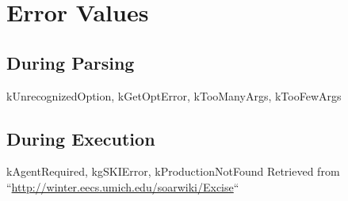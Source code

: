 \documentclass[10pt]{article}
\begin{document}
\section*{ Error Values }
\subsection*{ During Parsing }


 kUnrecognizedOption, kGetOptError, kTooManyArgs, kTooFewArgs
\subsection*{ During Execution }


 kAgentRequired, kgSKIError, kProductionNotFound Retrieved from ``\url{http://winter.eecs.umich.edu/soarwiki/Excise}``
\end{document}
